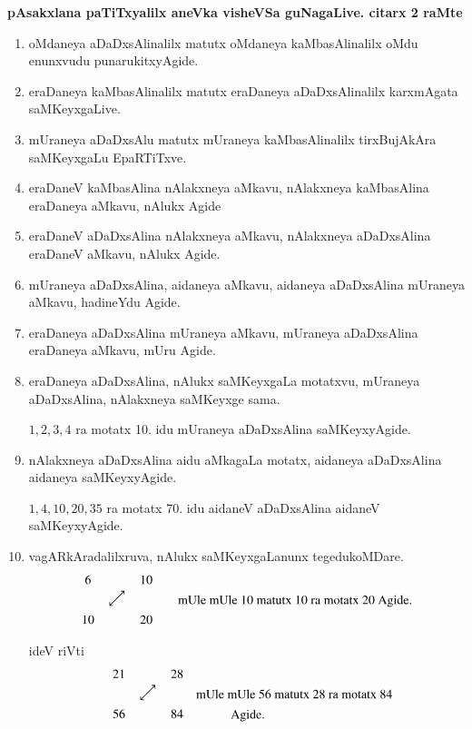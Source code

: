 \noindent
\textbf{pAsakxlana paTiTxyalilx aneVka visheVSa guNagaLive. citarx {\rm 2} raMte}
\begin{enumerate}[{\rm 1)}]
\item oMdaneya aDaDxsAlinalilx matutx oMdaneya kaMbasAlinalilx oMdu enunxvudu punarukitxyAgide.

\item eraDaneya kaMbasAlinalilx matutx eraDaneya aDaDxsAlinalilx karxmAgata saMKeyx\-gaLive.

\item mUraneya aDaDxsAlu matutx mUraneya kaMbasAlinalilx tirxBujAkAra saMKeyxgaLu EpaRTiTxve.

\item eraDaneV kaMbasAlina nAlakxneya aMkavu, nAlakxneya kaMbasAlina eraDaneya aMkavu, nAlukx Agide

\item eraDaneV aDaDxsAlina nAlakxneya aMkavu, nAlakxneya aDaDxsAlina eraDaneV aMkavu, nAlukx Agide.

\item mUraneya aDaDxsAlina, aidaneya aMkavu, aidaneya aDaDxsAlina mUraneya aMkavu, hadineYdu Agide.

\item eraDaneya aDaDxsAlina mUraneya aMkavu, mUraneya aDaDxsAlina eraDaneya aMkavu, mUru Agide.

\item eraDaneya aDaDxsAlina, nAlukx saMKeyxgaLa motatxvu, mUraneya aDaDxsAlina, nAlakxneya saMKeyxge sama.

$1, 2, 3, 4$ ra motatx {\rm 10}. idu mUraneya aDaDxsAlina saMKeyxyAgide.

\item nAlakxneya aDaDxsAlina aidu aMkagaLa motatx, aidaneya aDaDxsAlina aidaneya saMKeyxyAgide.

$1, 4, 10, 20, 35$ ra motatx {\rm 70}. idu aidaneV aDaDxsAlina aidaneV saMKeyxyAgide.

\item  vagARkAradalilxruva, nAlukx saMKeyxgaLanunx tegedukoMDare. 
$$
\begin{matrix}
6 && 10\\
& \rotatebox{45}{$\longleftrightarrow $} & \\
10 && 20
\end{matrix}
\qquad \text{mUle mUle {\rm 10} matutx {\rm 10} ra motatx {\rm 20} Agide.}
$$


ideV riVti
\begin{gather*}
\begin{matrix}
 & 21 && 28\\
&& \rotatebox{45}{$\longleftrightarrow $} & \\
& 56 && 84
\end{matrix}
\quad \text{mUle mUle {\rm 56} matutx {\rm 28} ra motatx {\rm 84}}\\[-0.55cm]
\text{~Agide.}
\end{gather*}


\end{enumerate}
